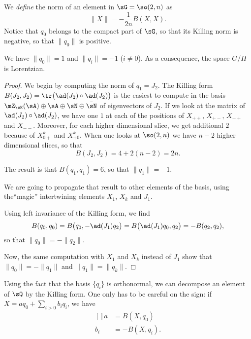 We \emph{define} the norm of an element in $\sG=\so(2,n)$ as
\begin{equation}	\label{LONGEqDefNormeKillingSix}
	\| X \|=-\frac{ 1 }{2n}B(X,X).
\end{equation}
Notice that $q_0$ belongs to the compact part of $\sG$, so that its Killing norm is negative, so that $\| q_0 \|$ is positive. 


\begin{proposition}		\label{LONGPropBaseQOrtho}
	We have $\| q_0 \|=1$ and $\| q_i \|=-1$ ($i\neq 0$). As a consequence, the space $G/H$ is Lorentzian. 
\end{proposition}


\begin{proof}
	We begin by computing the norm of $q_1=J_2$. The Killing form $B(J_2,J_2)=\tr\big( \ad(J_2)\circ\ad(J_2) \big)$ is the easiest to compute in the basis $\mZ_{\sK}(\sA)\oplus\sA\oplus\sN\oplus\bar\sN$ of eigenvectors of $J_2$. If we look at the matrix of $\ad(J_2)\circ\ad(J_2)$, we have one $1$ at each of the positions of $X_{++}$, $X_{+-}$, $X_{-+}$ and $X_{--}$. Moreover, for each higher dimensional slice, we get additional $2$ because of $X_{0+}^k$ and $X_{+0}^k$. When one looks at $\so(2,n)$ we have $n-2$ higher dimensional slices, so that 
	\begin{equation}
		B(J_2,J_2)=4+2(n-2)=2n.
	\end{equation}
	
	The result is that $B(q_1,q_1)=6$, so that $\| q_1 \|=-1$.

	We are going to propagate that result to other elements of the basis, using the``magic'' intertwining elements $X_1$, $X_k$ and $J_1$. 

	Using left invariance of the Killing form, we find
	\begin{equation}		\label{LONGEqCalculBBBqZeroqUnNirme}
		B(q_0,q_0)=B\big( q_0,-\ad(J_1)q_2 \big)=B\big( \ad(J_1)q_0,q_2 \big)=-B(q_2,q_2),
	\end{equation}
	so that $\| q_0 \| =-\| q_2 \|$.
	
	Now, the same computation with $X_1$ and $X_k$ instead of $J_1$ show that $\| q_0 \|=-\| q_1 \|$ and $\| q_1 \|=\| q_k \|$. 
\end{proof}



\begin{remark}		\label{LONGRemBProdScal}
	Using the fact that the basis $\{ q_i\}$ is orthonormal, we can decompose an element of $\sQ$ by the Killing form. One only has to be careful on the sign: if $X=aq_0+\sum_{i>0}b_iq_i$, we have
	\begin{equation}		\label{LONGEqsabKillProjComp}
		\begin{aligned}[]
			a&=B(X,q_0)\\
			b_i&=-B(X,q_i).
		\end{aligned}
	\end{equation}
\end{remark}


